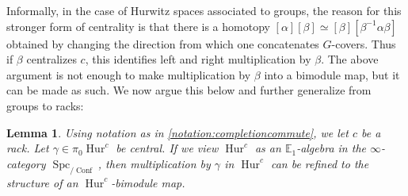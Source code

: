 \documentclass[12 pt]{amsart}
\theoremstyle{plain}
\newtheorem{lemma}[theorem]{Lemma}
\theoremstyle{definition}
\theoremstyle{remark}
\numberwithin{equation}{section}
\DeclareMathOperator\Spc{Spc}
\DeclareMathOperator\Hur{Hur}
\DeclareMathOperator\Conf{Conf}
\newcommand\EE{\mathbb{E}}
\begin{document}
Informally, in the case of Hurwitz spaces associated
to groups, the reason for this stronger form of centrality is that there is a homotopy
$[\alpha] [\beta] \simeq [\beta] [\beta^{-1} \alpha \beta]$ obtained by changing the direction from which one
concatenates $G$-covers. Thus if $\beta$ centralizes $c$, this identifies left and
right multiplication by $\beta$. 
The above argument is not enough to make multiplication by $\beta$ into a bimodule map, but it can be made as such. We now argue this below and further generalize from groups to racks:
\begin{lemma}\label{lemma:centralityspace}
	Using notation as in \autoref{notation:completioncommute},
	we let $c$ be a rack.
	Let $\gamma\in \pi_0\Hur^{c}$ 
	be central. If we
	view $\Hur^{c}$ as an $\EE_1$-algebra in the $\infty$-category
	$\Spc_{/\Conf}$, then multiplication by $\gamma$ in $\Hur^{c}$ can be refined to the structure of an %
  $\Hur^{c}$-bimodule map.
\end{lemma}
\end{document}
